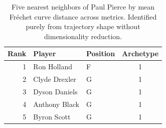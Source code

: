 \begin{table}[htbp]
  \centering\small
  \begin{tabular}{rllc}
    \toprule
    Rank & Player & Position & Archetype \\
    \midrule
    1 & Ron Holland & F & 1 \\
    2 & Clyde Drexler & G & 1 \\
    3 & Dyson Daniels & G & 1 \\
    4 & Anthony Black & G & 1 \\
    5 & Byron Scott & G & 1 \\
    \bottomrule
  \end{tabular}
  \caption{Five nearest neighbors of Paul Pierce by mean Fr\'{e}chet curve distance across metrics. Identified purely from trajectory shape without dimensionality reduction.}
  \label{tab:Paul_Pierce_frechet_curve_neighbors}
\end{table}

